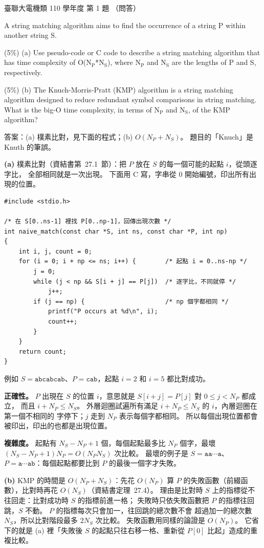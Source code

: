 \begin{pastexam}[label={px:ust-110-ee-ds-01}]{臺聯大電機類 110 學年度 第 1 題}
（問答）

A string matching algorithm aims to find the occurrence of a string P within another string S.

(5\%) (a) Use pseudo-code or C code to describe a string matching algorithm that has time complexity of
O(N$_\mathrm{P}$*N$_\mathrm{S}$), where N$_\mathrm{P}$ and N$_\mathrm{S}$ are the lengths of P and S,
respectively.

(5\%) (b) The Knuch-Morris-Pratt (KMP) algorithm is a string matching algorithm designed to reduce
redundant symbol comparisons in string matching. What is the big-O time complexity, in terms of
N$_\mathrm{P}$ and N$_\mathrm{S}$, of the KMP algorithm?
\end{pastexam}

\begin{pastsoln}
答案：(a) 樸素比對，見下面的程式；(b) $O(N_P + N_S)$。 題目的「Knuch」是 Knuth 的筆誤。

\textbf{(a)} 樸素比對（資結書第~27.1~節）：把 $P$ 放在 $S$ 的每一個可能的起點 $i$，從頭逐字比，
全部相同就是一次出現。 下面用 C 寫，字串從 $0$ 開始編號，印出所有出現的位置。
\begin{verbatim}
#include <stdio.h>

/* 在 S[0..ns-1] 裡找 P[0..np-1]，回傳出現次數 */
int naive_match(const char *S, int ns, const char *P, int np)
{
    int i, j, count = 0;
    for (i = 0; i + np <= ns; i++) {        /* 起點 i = 0..ns-np */
        j = 0;
        while (j < np && S[i + j] == P[j])  /* 逐字比，不同就停 */
            j++;
        if (j == np) {                      /* np 個字都相同 */
            printf("P occurs at %d\n", i);
            count++;
        }
    }
    return count;
}
\end{verbatim}
例如 $S = \texttt{abcabcab}$、$P = \texttt{cab}$，起點 $i = 2$ 和 $i = 5$ 都比對成功。

\textbf{正確性。} $P$ 出現在 $S$ 的位置 $i$，意思就是 $S[i + j] = P[j]$ 對 $0 \le j < N_P$ 都成立，
而且 $i + N_P \le N_S$。 外層迴圈試遍所有滿足 $i + N_P \le N_S$ 的 $i$，內層迴圈在第一個不相同的
字停下；$j$ 走到 $N_P$ 表示每個字都相同。 所以每個出現位置都會被印出，印出的也都是出現位置。

\textbf{複雜度。} 起點有 $N_S - N_P + 1$ 個，每個起點最多比 $N_P$ 個字，最壞
$(N_S - N_P + 1) N_P = O(N_P N_S)$ 次比較。 最壞的例子是 $S = \texttt{aa}\cdots\texttt{a}$、
$P = \texttt{a}\cdots\texttt{ab}$：每個起點都要比到 $P$ 的最後一個字才失敗。

\textbf{(b)} KMP 的時間是 $O(N_P + N_S)$：先花 $O(N_P)$ 算 $P$ 的失敗函數（前綴函數），比對時再花
$O(N_S)$（資結書定理~27.4）。 理由是比對時 $S$ 上的指標從不往回走：比對成功時 $S$ 的指標前進一格；
失敗時只依失敗函數把 $P$ 的指標往回跳，$S$ 不動。 $P$ 的指標每次只會加一，往回跳的總次數不會
超過加一的總次數 $N_S$，所以比對階段最多 $2N_S$ 次比較。 失敗函數用同樣的論證是 $O(N_P)$。
它省下的就是 (a) 裡「失敗後 $S$ 的起點只往右移一格、重新從 $P[0]$ 比起」造成的重複比較。
\end{pastsoln}
